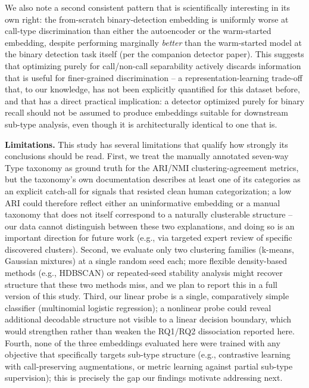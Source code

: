 \documentclass{article}
\begin{document}
We also note a second consistent pattern that is scientifically
interesting in its own right: the from-scratch binary-detection embedding
is uniformly worse at call-type discrimination than either the
autoencoder or the warm-started embedding, despite performing marginally
\emph{better} than the warm-started model at the binary detection task
itself (per the companion detector paper). This suggests that optimizing
purely for call/non-call separability actively discards information that
is useful for finer-grained discrimination -- a representation-learning
trade-off that, to our knowledge, has not been explicitly quantified for
this dataset before, and that has a direct practical implication: a
detector optimized purely for binary recall should not be assumed to
produce embeddings suitable for downstream sub-type analysis, even though
it is architecturally identical to one that is.

\textbf{Limitations.} This study has several limitations that qualify how
strongly its conclusions should be read. First, we treat the manually
annotated seven-way Type taxonomy as ground truth for the ARI/NMI
clustering-agreement metrics, but the taxonomy's own documentation
describes at least one of its categories as an explicit catch-all for
signals that resisted clean human categorization; a low ARI could
therefore reflect either an uninformative embedding or a manual taxonomy
that does not itself correspond to a naturally clusterable structure --
our data cannot distinguish between these two explanations, and doing so
is an important direction for future work (e.g., via targeted
expert review of specific discovered clusters). Second, we evaluate only
two clustering families (k-means, Gaussian mixtures) at a single random
seed each; more flexible density-based methods (e.g., HDBSCAN) or
repeated-seed stability analysis might recover structure that these two
methods miss, and we plan to report this in a full version of this study.
Third, our linear probe is a single, comparatively simple classifier
(multinomial logistic regression); a nonlinear probe could reveal
additional decodable structure not visible to a linear decision boundary,
which would strengthen rather than weaken the RQ1/RQ2 dissociation
reported here. Fourth, none of the three embeddings evaluated here were
trained with any objective that specifically targets sub-type structure
(e.g., contrastive learning with call-preserving augmentations, or
metric learning against partial sub-type supervision); this is precisely
the gap our findings motivate addressing next.
\end{document}
